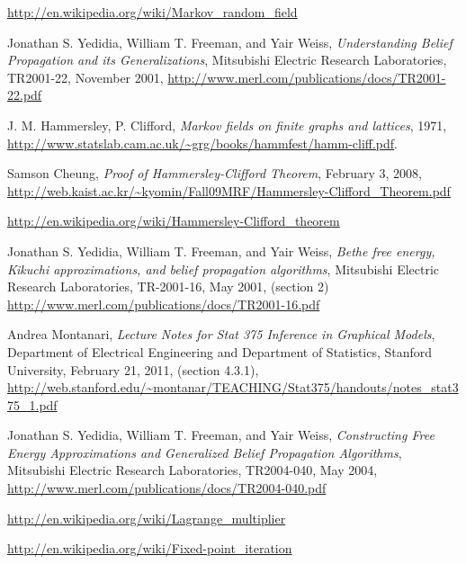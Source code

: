 \documentclass[fleqn,leqno]{article}
\begin{document}
\begin{thebibliography}{20}

  \url{http://en.wikipedia.org/wiki/Markov_random_field}

  Jonathan S. Yedidia, William T. Freeman, and Yair Weiss,
  \emph{Understanding Belief Propagation and its Generalizations},
  Mitsubishi Electric Research Laboratories,
  TR2001-22, 
  November 2001,
  \url{http://www.merl.com/publications/docs/TR2001-22.pdf}

  J. M. Hammersley, P. Clifford,
  \emph{Markov fields on finite graphs and lattices},
  1971,
  \url{http://www.statslab.cam.ac.uk/~grg/books/hammfest/hamm-cliff.pdf}.

  Samson Cheung,
  \emph{Proof of Hammersley-Clifford Theorem},
  February 3, 2008,
  \url{http://web.kaist.ac.kr/~kyomin/Fall09MRF/Hammersley-Clifford_Theorem.pdf}

  \url{http://en.wikipedia.org/wiki/Hammersley-Clifford_theorem}
  
  Jonathan S. Yedidia, William T. Freeman, and Yair Weiss,
  \emph{Bethe free energy, Kikuchi approximations, and belief propagation algorithms},
  Mitsubishi Electric Research Laboratories,
  TR-2001-16,
  May 2001,
  (section 2)
  \url{http://www.merl.com/publications/docs/TR2001-16.pdf}
  
  Andrea Montanari,
  \emph{Lecture Notes for Stat 375 Inference in Graphical Models},
  Department of Electrical Engineering and Department of Statistics, Stanford University,
  February 21, 2011,
  (section 4.3.1),
  \url{http://web.stanford.edu/~montanar/TEACHING/Stat375/handouts/notes_stat375_1.pdf}
  
  Jonathan S. Yedidia, William T. Freeman, and Yair Weiss,
  \emph{Constructing Free Energy Approximations and Generalized Belief Propagation Algorithms},
  Mitsubishi Electric Research Laboratories,
  TR2004-040,
  May 2004,
  \url{http://www.merl.com/publications/docs/TR2004-040.pdf}
  
  \url{http://en.wikipedia.org/wiki/Lagrange_multiplier}
  
  \url{http://en.wikipedia.org/wiki/Fixed-point_iteration}
  
\end{thebibliography}
\end{document}
